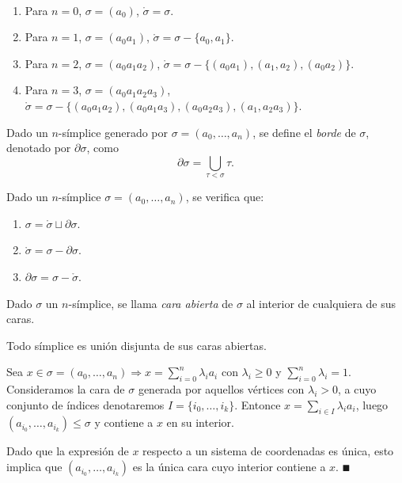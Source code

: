 \documentclass[HS.tex]{subfiles}
\begin{document}
\begin{ej}\
\begin{enumerate}
\item Para $n=0$, $\sigma=(a_0)$, $\mathring{\sigma}=\sigma$.
\item Para $n=1$, $\sigma=(a_0a_1)$, $\mathring{\sigma}=\sigma-\{a_0,a_1\}$. 
\item Para $n=2$, $\sigma=(a_0a_1a_2)$, $\mathring{\sigma}=\sigma-\{(a_0a_1),(a_1,a_2),(a_0a_2)\}$.
\item Para $n=3$, $\sigma=(a_0a_1a_2a_3)$, $\mathring{\sigma}=\sigma-\{(a_0a_1a_2),(a_0a_1a_3),(a_0a_2a_3),(a_1,a_2a_3)\}$.
\end{enumerate}
\end{ej}

\begin{defi}
Dado un $n$-símplice generado por $\sigma=(a_0,\dots, a_n)$, se define el \emph{borde} de $\sigma$, denotado por $\partial\sigma$, como 
$$\partial\sigma=\bigcup_{\tau<\sigma}\tau.$$
\end{defi}

\begin{prop}
Dado un $n$-símplice $\sigma=(a_0,\dots, a_n)$, se verifica que:
\begin{enumerate}
\item $\sigma=\mathring{\sigma}\sqcup\partial\sigma$.
\item $\mathring{\sigma}=\sigma-\partial\sigma$.
\item $\partial\sigma=\sigma-\mathring{\sigma}$.
\end{enumerate}
\end{prop}

\begin{defi}
Dado $\sigma$ un $n$-símplice, se llama \emph{cara abierta} de $\sigma$ al interior de cualquiera de sus caras.
\end{defi}
\begin{prop}
Todo símplice es unión disjunta de sus caras abiertas.
\end{prop}
\begin{dem}
Sea $x\in\sigma=(a_0,\dots,a_n)\Rightarrow x=\sum_{i=0}^n\lambda_ia_i$ con $\lambda_i\geq 0$ y $\sum_{i=0}^n\lambda_i=1$. Consideramos la cara de $\sigma$ generada por aquellos vértices con $\lambda_i>0$, a cuyo conjunto de índices denotaremos $I=\{i_0,\dots, i_k\}$. Entonce $x=\sum_{i\in I}\lambda_ia_i$, luego $(a_{i_0},\dots,a_{i_k})\leq\sigma$ y contiene a $x$ en su interior. 

Dado que la expresión de $x$ respecto a un sistema de coordenadas es única, esto implica que $(a_{i_0},\dots,a_{i_k})$ es la única cara cuyo interior contiene a $x$.
$\QED$
\end{dem}
\end{document}
